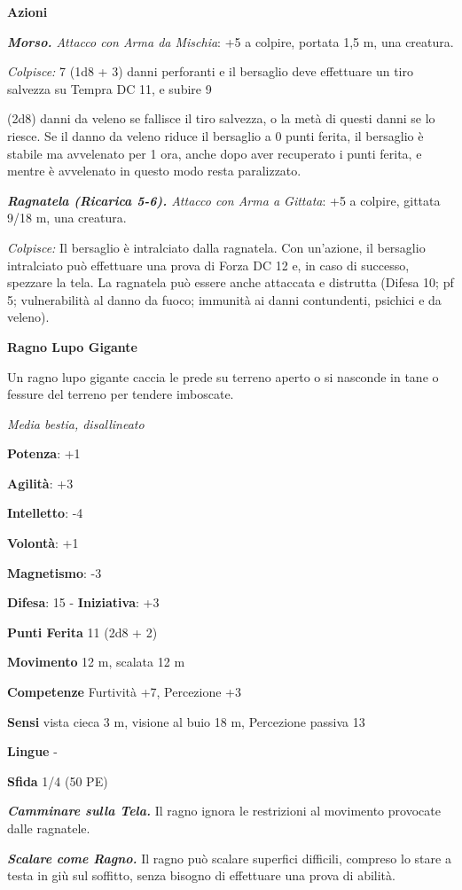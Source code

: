\begin{multicols}{2}
\textbf{Azioni}

\emph{\textbf{Morso.} Attacco con Arma da Mischia}: +5 a colpire,
portata 1,5 m, una creatura.

\emph{Colpisce:} 7 (1d8 + 3) danni perforanti e il bersaglio deve
effettuare un tiro salvezza su Tempra DC 11, e subire 9

(2d8) danni da veleno se fallisce il tiro salvezza, o la metà di questi
danni se lo riesce. Se il danno da veleno riduce il bersaglio a 0 punti
ferita, il bersaglio è stabile ma avvelenato per 1 ora, anche dopo aver
recuperato i punti ferita, e mentre è avvelenato in questo modo resta
paralizzato.

\emph{\textbf{Ragnatela (Ricarica 5-6).} Attacco con Arma a Gittata}: +5
a colpire, gittata 9/18 m, una creatura.

\emph{Colpisce:} Il bersaglio è intralciato dalla ragnatela. Con
un'azione, il bersaglio intralciato può effettuare una prova di Forza DC
12 e, in caso di successo, spezzare la tela. La ragnatela può essere
anche attaccata e distrutta (Difesa 10; pf 5; vulnerabilità al danno da
fuoco; immunità ai danni contundenti, psichici e da veleno).

\textbf{Ragno Lupo Gigante}

Un ragno lupo gigante caccia le prede su terreno aperto o si nasconde in
tane o fessure del terreno per tendere imboscate.

\emph{Media bestia, disallineato}

\textbf{Potenza}: +1

\textbf{Agilità}: +3

\textbf{Intelletto}: -4

\textbf{Volontà}: +1

\textbf{Magnetismo}: -3

\textbf{Difesa}: 15 - \textbf{Iniziativa}: +3

\textbf{Punti Ferita} 11 (2d8 + 2)

\textbf{Movimento} 12 m, scalata 12 m

\textbf{Competenze} Furtività +7, Percezione +3

\textbf{Sensi} vista cieca 3 m, visione al buio 18 m, Percezione passiva
13

\textbf{Lingue} -

\textbf{Sfida} 1/4 (50 PE)

\emph{\textbf{Camminare sulla Tela.}} Il ragno ignora le restrizioni al
movimento provocate dalle ragnatele.

\emph{\textbf{Scalare come Ragno.}} Il ragno può scalare superfici
difficili, compreso lo stare a testa in giù sul soffitto, senza bisogno
di effettuare una prova di abilità.


\end{multicols}
